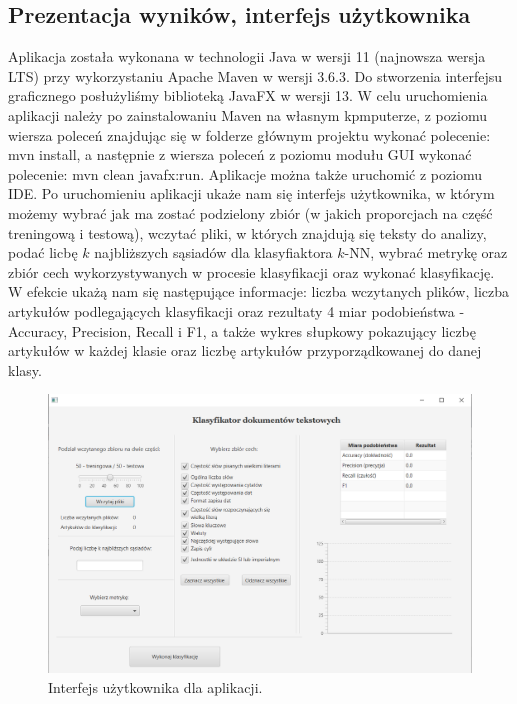 \documentclass{classrep}
\begin{document}
\subsection{Prezentacja wyników, interfejs użytkownika} 
Aplikacja została wykonana w technologii Java w wersji 11\cite{java_11} (najnowsza wersja LTS) przy wykorzystaniu Apache Maven w wersji 3.6.3\cite{maven}. Do stworzenia interfejsu graficznego posłużyliśmy biblioteką JavaFX w wersji 13\cite{javafx}. W celu uruchomienia aplikacji należy po zainstalowaniu Maven na własnym kpmputerze, z poziomu wiersza poleceń znajdując się w folderze głównym projektu wykonać polecenie: mvn install, a następnie z wiersza poleceń z poziomu modułu GUI wykonać polecenie: mvn clean javafx:run. Aplikacje można także uruchomić z poziomu IDE. Po uruchomieniu aplikacji ukaże nam się interfejs użytkownika, w którym możemy wybrać jak ma zostać podzielony zbiór (w jakich proporcjach na część treningową i testową), wczytać pliki, w których znajdują się teksty do analizy, podać licbę $k$ najbliższych sąsiadów dla klasyfiaktora $k$-NN, wybrać metrykę oraz zbiór cech wykorzystywanych w procesie klasyfikacji oraz wykonać klasyfikację. W efekcie ukażą nam się następujące informacje: liczba wczytanych plików, liczba artykułów podlegających klasyfikacji oraz rezultaty 4 miar podobieństwa - Accuracy, Precision, Recall i F1, a także wykres słupkowy pokazujący liczbę artykułów w każdej klasie oraz liczbę artykułów przyporządkowanej do danej klasy.
\\
\begin{figure}[H]
    \centering
    \includegraphics[width=15cm]{gui_ksr.PNG}
    \caption{Interfejs użytkownika dla aplikacji.}
\end{figure}
\end{document}
